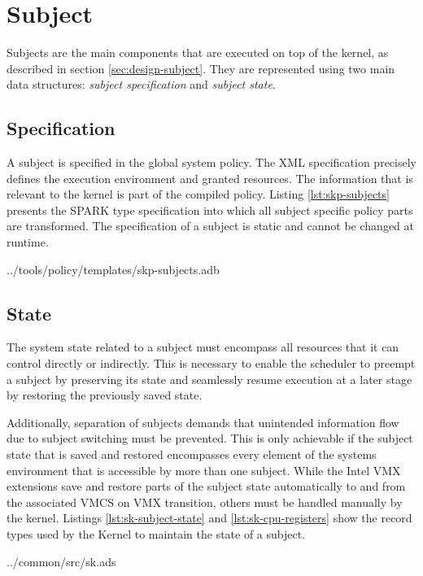 \section{Subject}\label{sec:impl-subject}
Subjects are the main components that are executed on top of the kernel, as
described in section \ref{sec:design-subject}. They are represented using two
main data structures: \emph{subject specification} and \emph{subject state}.

\subsection{Specification}
A subject is specified in the global system policy. The XML specification
precisely defines the execution environment and granted resources. The
information that is relevant to the kernel is part of the compiled policy.
Listing \ref{lst:skp-subjects} presents the SPARK type specification into which
all subject specific policy parts are transformed. The specification of a
subject is static and cannot be changed at runtime.


	{../tools/policy/templates/skp-subjects.adb}

\subsection{State}
The system state related to a subject must encompass all resources that it can
control directly or indirectly. This is necessary to enable the scheduler to
preempt a subject by preserving its state and seamlessly resume execution at a
later stage by restoring the previously saved state.

Additionally, separation of subjects demands that unintended information flow
due to subject switching must be prevented. This is only achievable if the
subject state that is saved and restored encompasses every element of the
systems environment that is accessible by more than one subject. While the Intel
VMX extensions save and restore parts of the subject state automatically to and
from the associated VMCS on VMX transition, others must be handled manually by
the kernel. Listings \ref{lst:sk-subject-state} and \ref{lst:sk-cpu-registers}
show the record types used by the Kernel to maintain the state of a subject.


	{../common/src/sk.ads}


